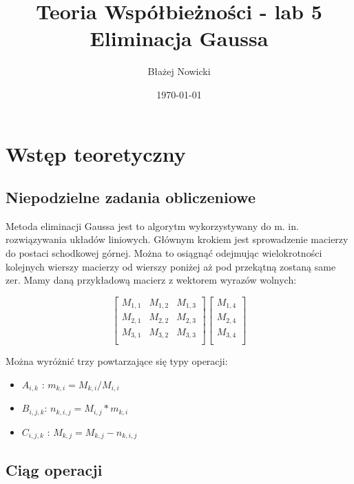 \documentclass[12pt, letterpaper]{article}
\title{Teoria Współbieżności - lab 5 \\ Eliminacja Gaussa}
\author{Błażej Nowicki}
\date{\today}
\begin{document}
\maketitle
\section{Wstęp teoretyczny}
\subsection{Niepodzielne zadania obliczeniowe}

Metoda eliminacji Gaussa jest to algorytm wykorzystywany do m. in.
rozwiązywania układów liniowych. Głównym krokiem jest sprowadzenie macierzy do postaci schodkowej
górnej. Można to osiągnąć odejmując wielokrotności kolejnych wierszy macierzy od wierszy poniżej
aż pod przekątną zostaną same zer.
Mamy daną przykładową macierz z wektorem wyrazów wolnych:

$$
	\begin{bmatrix}
		M_{1,1} & M_{1,2} & M_{1,3} \\
		M_{2,1} & M_{2,2} & M_{2,3} \\
		M_{3,1} & M_{3,2} & M_{3,3} \\
	\end{bmatrix}
	\begin{bmatrix}
		M_{1,4} \\
		M_{2,4} \\
		M_{3,4} \\
	\end{bmatrix}
$$

Można wyróżnić trzy powtarzające się typy operacji:
\begin{itemize}
	\item $ A_{i, k} $ :  $ m_{k,i} = M_{k,i} / M_{i,i} $
	\item $ B_{i,j,k} $: $n_{k,i,j} = M_{i,j} * m_{k,i} $
	\item $ C_{i,j,k} $ :  $ M_{k,j} = M_{k,j} - n_{k,i,j} $
\end{itemize}

\subsection{Ciąg operacji}
\end{document}
